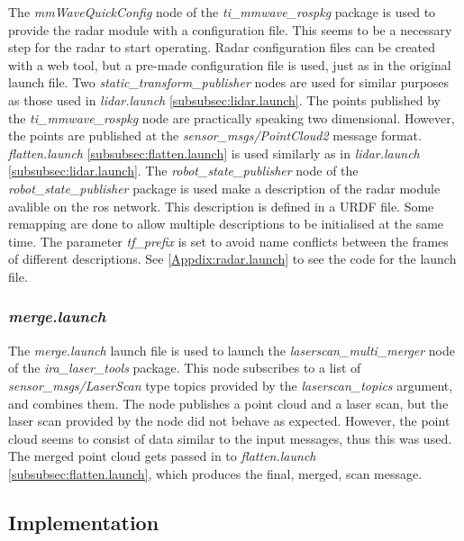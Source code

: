 The \textit{mmWaveQuickConfig} node of the \textit{ti\_mmwave\_rospkg} package is used to provide the radar module with a configuration file. This seems to be a necessary step for the radar to start operating. Radar configuration files can be created with a web tool, but a pre-made configuration file is used, just as in the original launch file. Two \textit{static\_transform\_publisher} nodes are used for similar purposes as those used in \textit{lidar.launch} \ref{subsubsec:lidar.launch}. The points published by the \textit{ti\_mmwave\_rospkg} node are practically speaking two dimensional. However, the points are published at the \textit{sensor\_msgs/PointCloud2} message format. \textit{flatten.launch} \ref{subsubsec:flatten.launch} is used similarly as in \textit{lidar.launch} \ref{subsubsec:lidar.launch}. The \textit{robot\_state\_publisher} node of the \textit{robot\_state\_publisher} package is used make a description of the radar module avalible on the ros network. This description is defined in a URDF file. Some remapping are done to allow multiple descriptions to be initialised at the same time. The parameter \textit{tf\_prefix} is set to avoid name conflicts between the frames of different descriptions. See \ref{Appdix:radar.launch} to see the code for the launch file.

\subsubsection{\textit{merge.launch}}\label{subsubsec:merge.launch}
The \textit{merge.launch} launch file is used to launch the \textit{laserscan\_multi\_merger} node of the \textit{ira\_laser\_tools} package. This node subscribes to a list of \textit{sensor\_msgs/LaserScan} type topics provided by the \textit{laserscan\_topics} argument, and combines them. The node publishes a point cloud and a laser scan, but the laser scan provided by the node did not behave as expected. However, the point cloud seems to consist of data similar to the input messages, thus this was used. The merged point cloud gets passed in to \textit{flatten.launch} \ref{subsubsec:flatten.launch}, which produces the final, merged, scan message.

\subsection{Implementation}








